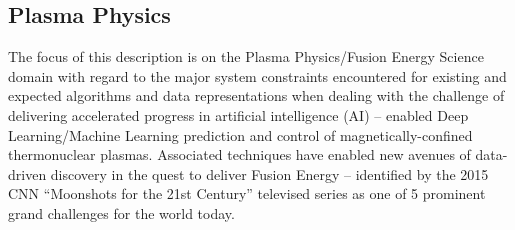 \subsection{Plasma Physics}


The focus of this description is on the Plasma Physics/Fusion Energy Science domain with regard to the major system constraints encountered for existing and expected algorithms and data representations when dealing with the challenge of delivering accelerated progress in artificial intelligence (AI) – enabled Deep Learning/Machine Learning prediction and control of magnetically-confined thermonuclear plasmas.  Associated techniques have enabled new avenues of data-driven discovery in the quest to deliver Fusion Energy – identified by the 2015 CNN “Moonshots for the 21st Century” televised series as one of 5 prominent grand challenges for the world today.

